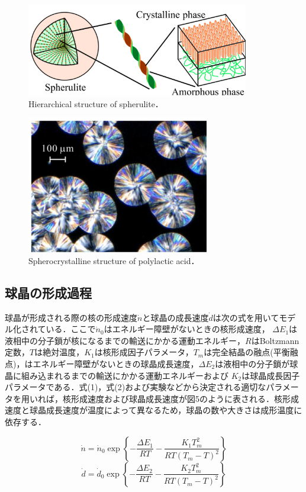 \begin{figure}[htbp]
    \centering %
    \includegraphics[width=100truemm,clip]{fig/fig_階層構造}
    \caption{Hierarchical structure of spherulite．}
    \label{fig:階層構造}
\end{figure}

\begin{figure}[htbp]
    \centering %
    \includegraphics[width=100truemm,clip]{fig/fig_球晶構造}
    \caption{Spherocrystalline structure of polylactic acid．}
    \label{fig:球晶構造}
\end{figure}

\subsection{球晶の形成過程}
球晶が形成される際の核の形成速度$\dot n$と球晶の成長速度$\dot d$は次の式を用いてモデル化されている．ここで$\dot n_0$はエネルギー障壁がないときの核形成速度， $\Delta E_1$は液相中の分子鎖が核になるまでの輸送にかかる運動エネルギー，$R$はBoltzmann定数，$T$は絶対温度，$K_1$は核形成因子パラメータ，$T_m$は完全結晶の融点(平衡融点)，はエネルギー障壁がないときの球晶成長速度，$\Delta E_2$は液相中の分子鎖が球晶に組み込まれるまでの輸送にかかる運動エネルギーおよび $K_2$は球晶成長因子パラメータである．式(1)，式(2)および実験などから決定される適切なパラメータを用いれば，核形成速度および球晶成長速度が図5のように表される．核形成速度と球晶成長速度が温度によって異なるため，球晶の数や大きさは成形温度に依存する．

\begin{equation}
    \dot n = \dot n_0 \exp \left\{ -\frac{\Delta E_1}{RT} - \frac{K_1 T_m^2}{RT(T_m - T)^2} \right\}
\end{equation}
\begin{equation}
    \dot d = \dot d_0 \exp \left\{ -\frac{\Delta E_2}{RT} - \frac{K_2 T_m^2}{RT(T_m - T)^2} \right\}
\end{equation}

